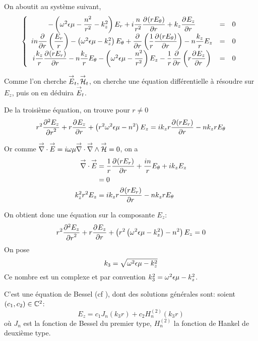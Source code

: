 On aboutit au système suivant,
\begin{equation}
    \left\lbrace
    \begin{array}{ccc}
        -\left(\w^2\eps\mu -\frac{n^2}{r^2}  - k_z^2\right)E_r  +i\frac{n}{r^2}\ddr{r}{(rE_\theta)}  +k_z\ddr{r}{E_z} & = & 0\\
        in\ddr{r}{}\left(\frac{E_r}{r}\right) -\left(\w^2\eps\mu - k_z^2\right)E_\theta + \ddr{r}{}\left(\frac{1}{r}\ddr{r}{(rE_\theta)}\right)  - n\frac{k_z}{r}E_z & = & 0\\
        i\frac{k_z}{r}\ddr{r}{(rE_r)}  - n\frac{k_z}{r}E_\theta  -\left(\w^2\eps\mu - \frac{n^2}{r^2} \right)E_z - \frac{1}{r}\ddr{r}{}\left(r\ddr{r}{E_z}\right) & = & 0
    \end{array}
    \right.
\end{equation}

Comme l'on cherche $\vE_t, \vH_t$, on cherche une équation différentielle à résoudre sur $E_z$, puis on en déduira $\vE_t$.

De la troisième  équation, on trouve pour $r\not=0$
\begin{equation}
r^2 \ddr[2]{r}{E_z} + r\ddr{r}{E_z} + \left(r^2\w^2\eps\mu - n^2\right)E_z =ik_zr\ddr{r}{(rE_r)} -  nk_zrE_\theta
\end{equation}


Or comme $\vdiv \vE = i\w\mu\vdiv\vrot\vH = 0$, on a
\begin{align}
    \vdiv\vE &= \frac{1}{r}\ddr{r}{(rE_r)} + \frac{in}{r}E_\theta + ik_zE_z
    \\
    &=0
    \\
    k_z^2r^2 E_z &= ik_zr\ddr{r}{(rE_r)} - nk_zrE_\theta
\end{align}

On obtient donc une équation sur la composante $E_z$:
\begin{equation}
    r^2 \ddr[2]{r}{E_z} + r\ddr{r}{E_z} + \left(r^2\left(\w^2\eps\mu - k_z^2\right) - n^2\right)E_z = 0
\end{equation}
On pose 
\begin{equation}
    k_3 = \sqrt{\w^2\eps\mu - k_z^2}
\end{equation}
Ce nombre est un complexe et par convention $k_3^2 = \w^2\eps\mu - k_z^2$.

C'est une équation de Bessel (cf \cite[eq (6.80)]{bowman_introduction_1958}), dont des solutions générales sont: soient $(c_1,c_2) \in \CC^2$:
\begin{equation}
    E_z = c_1 J_n\left(k_3r\right) + c_2 H_n^{(2)}\left(k_3r\right)
\end{equation}
où $J_n$ est la fonction de Bessel du premier type, $H_n^{(2)}$ la fonction de Hankel de deuxième type. 

